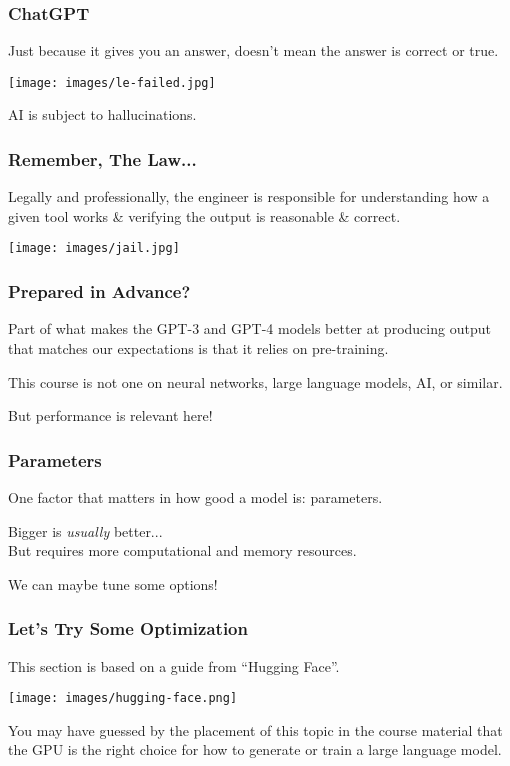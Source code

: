 \begin{frame}
\frametitle{ChatGPT}

Just because it gives you an answer, doesn't mean the answer is correct or true.

\begin{center}
	\texttt{[image: images/le-failed.jpg]}
\end{center}

AI is subject to \alert{hallucinations}.

\end{frame}

\begin{frame}
\frametitle{Remember, The Law...}
Legally and professionally, the engineer is responsible for understanding how a given tool works \& verifying the output is reasonable \& correct.

\begin{center}
	\texttt{[image: images/jail.jpg]}
\end{center}

\end{frame}

\begin{frame}
\frametitle{Prepared in Advance?}
Part of what makes the GPT-3 and GPT-4 models better at producing output that matches our expectations is that it relies on pre-training.

This course is not one on neural networks, large language models, AI, or similar.

But performance is relevant here!

\end{frame}

\begin{frame}
\frametitle{Parameters}

One factor that matters in how good a model is: parameters.

Bigger is \textit{usually} better...\\
\quad But requires more computational and memory resources.

We can maybe tune some options!

\end{frame}

\begin{frame}
\frametitle{Let's Try Some Optimization}

This section is based on a guide from ``Hugging Face''. 

\begin{center}
	\texttt{[image: images/hugging-face.png]}
\end{center}

You may have guessed by the placement of this topic in the course material that the GPU is the right choice for how to generate or train a large language model. 

\end{frame}

